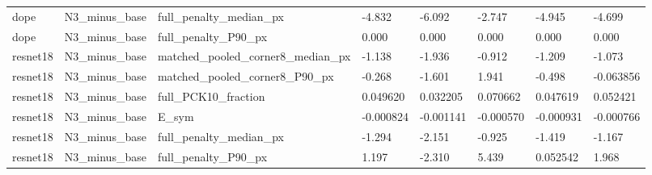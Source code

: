 \begin{table}[t]
{\begin{tabular}{llllllll}
dope & N3\_minus\_base & full\_penalty\_median\_px & -4.832 & -6.092 & -2.747 & -4.945 & -4.699 \\
dope & N3\_minus\_base & full\_penalty\_P90\_px & 0.000 & 0.000 & 0.000 & 0.000 & 0.000 \\
resnet18 & N3\_minus\_base & matched\_pooled\_corner8\_median\_px & -1.138 & -1.936 & -0.912 & -1.209 & -1.073 \\
resnet18 & N3\_minus\_base & matched\_pooled\_corner8\_P90\_px & -0.268 & -1.601 & 1.941 & -0.498 & -0.063856 \\
resnet18 & N3\_minus\_base & full\_PCK10\_fraction & 0.049620 & 0.032205 & 0.070662 & 0.047619 & 0.052421 \\
resnet18 & N3\_minus\_base & E\_sym & -0.000824 & -0.001141 & -0.000570 & -0.000931 & -0.000766 \\
resnet18 & N3\_minus\_base & full\_penalty\_median\_px & -1.294 & -2.151 & -0.925 & -1.419 & -1.167 \\
resnet18 & N3\_minus\_base & full\_penalty\_P90\_px & 1.197 & -2.310 & 5.439 & 0.052542 & 1.968 \\
\hline
\end{tabular}}
\end{table}
